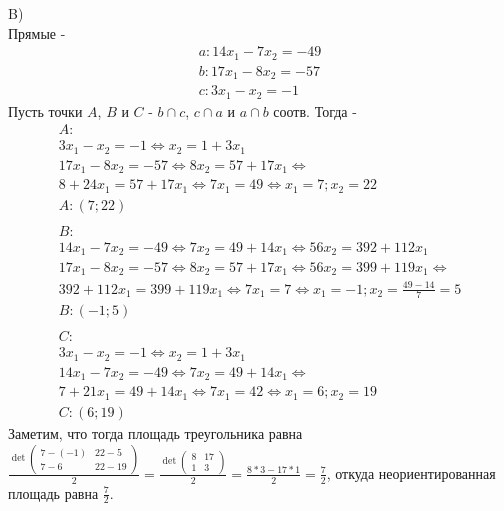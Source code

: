 		\\
		\\
		B)\\
		Прямые -
		\begin{gather*}
		a: 14x_1 - 7x_2 = -49 \\
		b: 17x_1 - 8x_2 = -57 \\
		c: 3x_1 - x_2 = -1 
		\end{gather*}
		Пусть точки $A$, $B$ и $C$ - $b \cap c$, $c \cap a$ и $a \cap b$ соотв. Тогда -
		\begin{gather*}
		A:\\
		3x_1 - x_2 = -1 \Longleftrightarrow x_2 = 1 + 3x_1 \\
		17x_1 - 8x_2 = -57 \Longleftrightarrow 8x_2 = 57 + 17x_1 \Longleftrightarrow \\
		8 + 24x_1 = 57 + 17x_1 \Longleftrightarrow 7x_1 = 49 \Longleftrightarrow x_1 = 7; x_2 = 22 \\
		A: (7;22)
		\\ \\
		B:\\
		14x_1 - 7x_2 = -49 \Longleftrightarrow 7x_2 = 49 + 14x_1 \Longleftrightarrow 56x_2 = 392 + 112x_1 \\
		17x_1 - 8x_2 = -57 \Longleftrightarrow 8x_2 = 57 + 17x_1 \Longleftrightarrow 56x_2 = 399 + 119x_1 \Longleftrightarrow \\
		392 + 112x_1 = 399 + 119x_1 \Longleftrightarrow 7x_1 = 7 \Longleftrightarrow x_1 = -1; x_2 = \frac{49 - 14}{7} = 5 \\
		B: (-1;5)
		\\ \\
		C:\\
		3x_1 - x_2 = -1 \Longleftrightarrow x_2 = 1 + 3x_1 \\
		14x_1 - 7x_2 = -49 \Longleftrightarrow 7x_2 = 49 + 14x_1 \Longleftrightarrow \\
		7 + 21x_1 = 49 + 14x_1 \Longleftrightarrow 7x_1 = 42 \Longleftrightarrow x_1 = 6; x_2 = 19 \\
		C: (6;19)
		\end{gather*}
		Заметим, что тогда площадь треугольника равна $\frac{\det \begin{pmatrix} 7 - (-1) & 22 - 5 \\ 7 - 6 & 22 - 19 \end{pmatrix}}{2} = \frac{\det \begin{pmatrix} 8 & 17 \\ 1 & 3 \end{pmatrix}}{2} = \frac{8*3 - 17*1}{2} = \frac{7}{2}$, откуда неориентированная площадь равна $\frac{7}{2}$.

